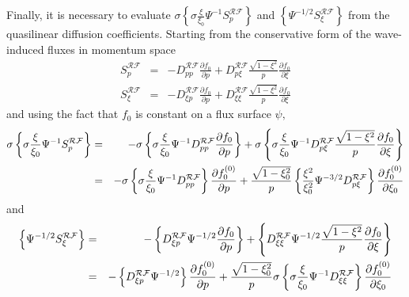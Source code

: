 Finally, it is necessary to evaluate $\sigma \left\{ \sigma \frac{\xi }{\xi
_{0}}\Psi ^{-1}S_{p}^{\mathcal{RF}}\right\} $ and $\left\{ \Psi
^{-1/2}S_{\xi }^{\mathcal{RF}}\right\} $ from the quasilinear diffusion
coefficients. Starting from the conservative form of the wave-induced fluxes
in momentum space
\begin{eqnarray}
S_{p}^{\mathcal{RF}} &=&-D_{pp}^{\mathcal{RF}}\frac{\partial f_{0}}{\partial
p}+D_{p\xi }^{\mathcal{RF}}\frac{\sqrt{1-\xi ^{2}}}{p}\frac{\partial f_{0}}{
\partial \xi } \\
S_{\xi }^{\mathcal{RF}} &=&-D_{\xi p}^{\mathcal{RF}}\frac{\partial f_{0}}{
\partial p}+D_{\xi \xi }^{\mathcal{RF}}\frac{\sqrt{1-\xi ^{2}}}{p}\frac{
\partial f_{0}}{\partial \xi }
\end{eqnarray}
and using the fact that $f_{0}$ is constant on a flux surface $\psi ,$%
\begin{eqnarray}
\sigma \left\{ \sigma \frac{\xi }{\xi _{0}}\Psi ^{-1}S_{p}^{\mathcal{RF}
}\right\} &=&-\sigma \left\{ \sigma \frac{\xi }{\xi _{0}}\Psi ^{-1}D_{pp}^{%
\mathcal{RF}}\frac{\partial f_{0}}{\partial p}\right\} +\sigma \left\{
\sigma \frac{\xi }{\xi _{0}}\Psi ^{-1}D_{p\xi }^{\mathcal{RF}}\frac{\sqrt{
1-\xi ^{2}}}{p}\frac{\partial f_{0}}{\partial \xi }\right\}  \nonumber \\
&=&-\sigma \left\{ \sigma \frac{\xi }{\xi _{0}}\Psi ^{-1}D_{pp}^{\mathcal{RF}
}\right\} \frac{\partial f_{0}^{\left( 0\right) }}{\partial p}+\frac{\sqrt{
1-\xi _{0}^{2}}}{p}\left\{ \frac{\xi ^{2}}{\xi _{0}^{2}}\Psi ^{-3/2}D_{p\xi
}^{\mathcal{RF}}\right\} \frac{\partial f_{0}^{\left( 0\right) }}{\partial
\xi _{0}}
\end{eqnarray}
and
\begin{eqnarray}
\left\{ \Psi ^{-1/2}S_{\xi }^{\mathcal{RF}}\right\} &=&-\left\{ D_{\xi p}^{%
\mathcal{RF}}\Psi ^{-1/2}\frac{\partial f_{0}}{\partial p}\right\} +\left\{
D_{\xi \xi }^{\mathcal{RF}}\Psi ^{-1/2}\frac{\sqrt{1-\xi ^{2}}}{p}\frac{
\partial f_{0}}{\partial \xi }\right\}  \nonumber \\
&=&-\left\{ D_{\xi p}^{\mathcal{RF}}\Psi ^{-1/2}\right\} \frac{\partial
f_{0}^{\left( 0\right) }}{\partial p}+\frac{\sqrt{1-\xi _{0}^{2}}}{p}\sigma
\left\{ \sigma \frac{\xi }{\xi _{0}}\Psi ^{-1}D_{\xi \xi }^{\mathcal{RF}
}\right\} \frac{\partial f_{0}^{\left( 0\right) }}{\partial \xi _{0}}
\end{eqnarray}

